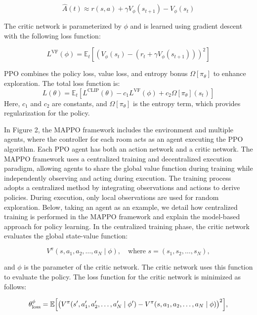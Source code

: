 \documentclass[preprint,12pt]{elsarticle}
\begin{document}
\begin{equation}
\hat{A}(t) \approx r(s, a) + \gamma V_\phi(s_{t+1}) - V_\phi(s_t)
\end{equation}

The critic network is parameterized by $\phi$ and is learned using gradient descent with the following loss function:

\begin{equation}
L^{\text{VF}}(\phi) = \mathbb{E}_t \left[ (V_\phi(s_t) - (r_t + \gamma V_\phi(s_{t+1})))^2 \right]
\end{equation}

PPO combines the policy loss, value loss, and entropy bonus $\Omega[\pi_\theta]$ to enhance exploration. 
The total loss function is:
\begin{equation}
L(\theta) = \mathbb{E}_t \left[ L^{\text{CLIP}}(\theta) - c_1 L^{\text{VF}}(\phi) + c_2 \Omega[\pi_\theta](s_t) \right]
\end{equation}
Here, $c_1$ and $c_2$ are constants, and $\Omega[\pi_\theta]$ is the entropy term, 
which provides regularization for the policy.

In Figure 2, the MAPPO framework includes the environment and multiple agents, where the controller for 
each room acts as an agent executing the PPO algorithm. Each PPO agent has both an action network and a 
critic network. The MAPPO framework uses a centralized training and decentralized execution paradigm, allowing 
agents to share the global value function during training while independently observing and acting during execution. 
The training process adopts a centralized method by integrating observations and actions to derive policies. 
During execution, only local observations are used for random exploration. Below, taking an agent as an example, 
we detail how centralized training is performed in the MAPPO framework and explain the model-based approach for policy learning.
In the centralized training phase, the critic network evaluates the global state-value function:

\begin{equation}
V^\pi(s, a_1, a_2, \ldots, a_N \mid \phi), \quad \text{where } s = (s_1, s_2, \ldots, s_N),
\end{equation}

and $\phi$ is the parameter of the critic network. The critic network uses this function to evaluate the policy. 
The loss function for the critic network is minimized as follows:

\begin{equation}
\theta_{\text{loss}}^\phi = \mathbb{E}\Bigl[\bigl(V^\pi(s', a_1', a_2', \ldots, a_N' \mid \phi') - V^\pi(s, a_1, a_2, \ldots, a_N \mid \phi)\bigr)^2\Bigr],
\end{equation}
\end{document}
